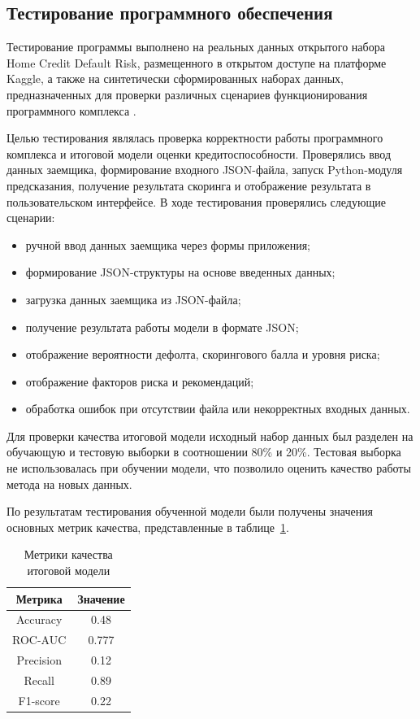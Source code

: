 \subsection{Тестирование программного обеспечения}

Тестирование программы выполнено на реальных данных открытого набора Home Credit Default Risk, размещенного в открытом доступе на платформе Kaggle, а также на синтетически сформированных наборах данных, предназначенных для проверки различных сценариев функционирования программного комплекса \cite{KaggleHomeCreditDefaultRisk}.

Целью тестирования являлась проверка корректности работы программного комплекса и итоговой модели оценки кредитоспособности. Проверялись ввод данных заемщика, формирование входного JSON-файла, запуск Python-модуля предсказания, получение результата скоринга и отображение результата в пользовательском интерфейсе.
\newpage
В ходе тестирования проверялись следующие сценарии:
\begin{itemize}
  \item ручной ввод данных заемщика через формы приложения;
  \item формирование JSON-структуры на основе введенных данных;
  \item загрузка данных заемщика из JSON-файла;
  \item получение результата работы модели в формате JSON;
  \item отображение вероятности дефолта, скорингового балла и уровня риска;
  \item отображение факторов риска и рекомендаций;
  \item обработка ошибок при отсутствии файла или некорректных входных данных.
\end{itemize}

Для проверки качества итоговой модели исходный набор данных был разделен на обучающую и тестовую выборки в соотношении 80\% и 20\%. Тестовая выборка не использовалась при обучении модели, что позволило оценить качество работы метода на новых данных.

По результатам тестирования обученной модели были получены значения основных метрик качества, представленные в таблице~\ref{tab:metrics}.

\begin{table}[ht!]
  \centering
  \caption{Метрики качества итоговой модели}
  \label{tab:metrics}
  \begin{tabular}{|c|c|}
    \hline
    Метрика   & Значение \\
    \hline
    Accuracy  & 0.48     \\
    ROC-AUC   & 0.777    \\
    Precision & 0.12     \\
    Recall    & 0.89     \\
    F1-score  & 0.22     \\
    \hline
  \end{tabular}
\end{table}

